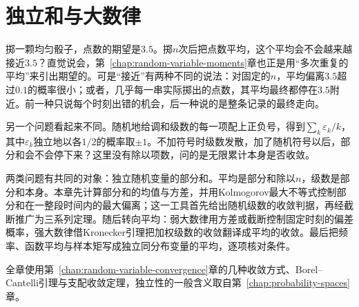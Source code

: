 \chapter{独立和与大数律}
\label{chap:laws-of-large-numbers}

掷一颗均匀骰子，点数的期望是$3.5$。掷$n$次后把点数平均，这个平均会不会越来越接近$3.5$？直觉说会，第~\ref{chap:random-variable-moments}章也正是用“多次重复的平均”来引出期望的。可是“接近”有两种不同的说法：对固定的$n$，平均偏离$3.5$超过$0.1$的概率很小；或者，几乎每一串实际掷出的点数，其平均最终都停在$3.5$附近。前一种只说每个时刻出错的机会，后一种说的是整条记录的最终走向。

另一个问题看起来不同。随机地给调和级数的每一项配上正负号，得到$\sum_k\varepsilon_k/k$，其中$\varepsilon_k$独立地以各$1/2$的概率取$\pm1$。不加符号时级数发散，加了随机符号以后，部分和会不会停下来？这里没有除以项数，问的是无限累计本身是否收敛。

两类问题有共同的对象：独立随机变量的部分和。平均是部分和除以$n$，级数是部分和本身。本章先计算部分和的均值与方差，并用Kolmogorov最大不等式控制部分和在一整段时间内的最大偏离；这一工具首先给出随机级数的收敛判据，再经截断推广为三系列定理。随后转向平均：弱大数律用方差或截断控制固定时刻的偏差概率，强大数律借Kronecker引理把加权级数的收敛翻译成平均的收敛。最后把频率、函数平均与样本矩写成独立同分布变量的平均，逐项核对条件。

全章使用第~\ref{chap:random-variable-convergence}章的几种收敛方式、Borel–Cantelli引理与支配收敛定理，独立性的一般含义取自第~\ref{chap:probability-spaces}章。












